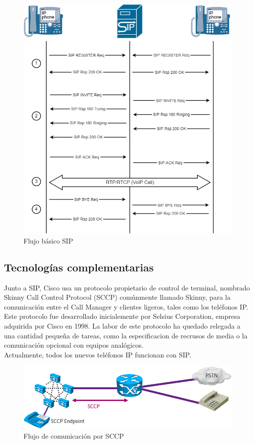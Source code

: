 \documentclass[a4paper, 12pt]{book}
\begin{document}
\begin{figure}
  \centering
  \includegraphics{img/fig_sip_flow}
  \caption{Flujo básico SIP}
  \label{figura:fig_sip_flow}
\end{figure}




\subsection{Tecnologías complementarias}
\label{sec:tecnologias-complementarias}
Junto a SIP, Cisco usa un protocolo propietario de control de terminal, nombrado Skinny Call Control Protocol (SCCP) comúnmente llamado Skinny, para la comunicación entre el Call Manager y clientes ligeros, tales como los teléfonos IP. Este protocolo fue desarrollado inicialemente por Selsius Corporation, empresa adquirida por Cisco en 1998. La labor de este protocolo ha quedado relegada a una cantidad pequeña de tareas, como la especificacion de recrusos de media o la comunicación opcional con equipos analógicos. \\Actualmente, todos los nuevos teléfonos IP funcionan con SIP.
\\

\begin{figure}[h]
  \centering
  \includegraphics{img/fig_skinny}
  \caption{Flujo de comunicación por SCCP}
  \label{figura:fig_skinny}
\end{figure}
\end{document}
